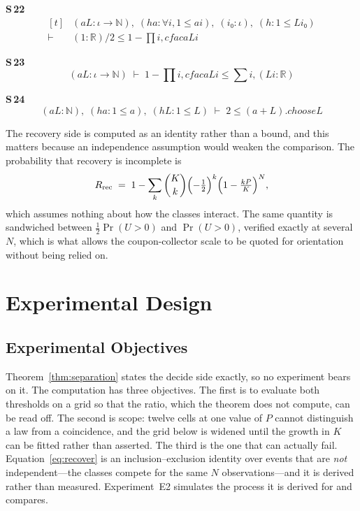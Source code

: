 \noindent\textbf{S\,22}\quad{}
{\footnotesize\[ \begin{aligned}[t]
&(\mathit{a} \mathit{L} : \iota \to \mathbb{N} ),\; (\mathit{ha} : \forall \mathit{i}, 1 \leq \mathit{a} \mathit{i}),\; (\mathit{i₀} : \iota ),\; (\mathit{h} : 1 \leq \mathit{L} \mathit{i₀})\\
\vdash\;&(1:\mathbb{R} ) / 2 \leq 1 - \textstyle\prod \mathit{i}, \mathit{cfac} \mathit{a} \mathit{L} \mathit{i}
\end{aligned} \]}

\noindent\textbf{S\,23}\quad{}
{\footnotesize\[ (\mathit{a} \mathit{L} : \iota \to \mathbb{N} ) \;\vdash\; 1 - \textstyle\prod \mathit{i}, \mathit{cfac} \mathit{a} \mathit{L} \mathit{i} \leq \textstyle\sum \mathit{i}, (\mathit{L} \mathit{i} : \mathbb{R} ) \]}

\noindent\textbf{S\,24}\quad{}
{\footnotesize\[ (\mathit{a} \mathit{L} : \mathbb{N} ),\; (\mathit{ha} : 1 \leq \mathit{a}),\; (\mathit{hL} : 1 \leq \mathit{L}) \;\vdash\; 2 \leq (\mathit{a} + \mathit{L}).\mathit{choose} \mathit{L} \]}


The recovery side is computed as an identity rather than a bound, and this matters because an
independence assumption would weaken the comparison. The probability that recovery is
incomplete is
\begin{equation}
R_{\mathrm{rec}}
\;=\;1-\sum_{k}\binom{K}{k}\Bigl(-\tfrac12\Bigr)^{k}
     \Bigl(1-\tfrac{kP}{K}\Bigr)^{N},
\label{eq:recover}
\end{equation}
which assumes nothing about how the classes interact. The same quantity is sandwiched between
$\tfrac12\Pr(U>0)$ and $\Pr(U>0)$, verified exactly at several $N$, which is what allows the
coupon-collector scale to be quoted for orientation without being relied on.

\section{Experimental Design}
\label{sec:expdesign}

\subsection{Experimental Objectives}

Theorem~\ref{thm:separation} states the decide side exactly, so no experiment bears on it. The
computation has three objectives. The first is to evaluate both thresholds on a grid so that
the ratio, which the theorem does not compute, can be read off. The second is scope: twelve
cells at one value of $P$ cannot distinguish a law from a coincidence, and the grid below is
widened until the growth in $K$ can be fitted rather than asserted. The third is the one that
can actually fail. Equation~\eqref{eq:recover} is an inclusion--exclusion identity over events
that are \emph{not} independent---the classes compete for the same $N$ observations---and it
is derived rather than measured. Experiment~E2 simulates the process it is derived for and
compares.

